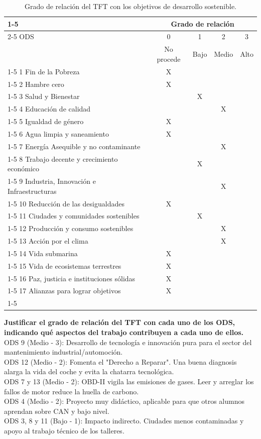 \begin{center}

\begin{table}[!htbp]
\caption{Grado de relación del TFT con los objetivos de desarrollo sostenible.}
\label{tab:ODS}
\centering
\begin{tabular}{|l|c|c|c|c|}
\cline{1-5}
  & \multicolumn{4}{c|}{Grado de relación} \\ \cline{2-5}
 ODS & 0 & 1 & 2 & 3 \\
  & No procede & Bajo & Medio & Alto \\
  \cline{1-5}
1 Fin de la Pobreza & X & & & \\ \cline{1-5}
2 Hambre cero & X & & & \\ \cline{1-5}
3 Salud y Bienestar & & X & & \\ \cline{1-5}
4 Educación de calidad & & & X & \\ \cline{1-5}
5 Igualdad de género & X & & & \\ \cline{1-5}
6 Agua limpia y saneamiento & X & & & \\ \cline{1-5}
7 Energía Asequible y no contaminante & & & X & \\ \cline{1-5}
8 Trabajo decente y crecimiento económico & & X & & \\ \cline{1-5}
9 Industria, Innovación e Infraestructuras & & & X & \\ \cline{1-5}
10 Reducción de las desigualdades & X & & & \\ \cline{1-5}
11 Ciudades y comunidades sostenibles & & X & & \\ \cline{1-5}
12 Producción y consumo sostenibles & & & X & \\ \cline{1-5}
13 Acción por el clima & & & X & \\ \cline{1-5}
14 Vida submarina & X & & & \\ \cline{1-5}
15 Vida de ecosistemas terrestres & X & & & \\ \cline{1-5}
16 Paz, justicia e instituciones sólidas & X & & & \\ \cline{1-5}
17 Alianzas para lograr objetivos & X & & & \\ \cline{1-5}
\end{tabular}%
\end{table}
\end{center}
\textbf{Justificar el grado de relación del TFT con cada uno de los ODS, indicando qué aspectos del trabajo contribuyen a cada uno de ellos.}
\\
ODS 9 (Medio - 3): Desarrollo de tecnología e innovación pura para el sector del mantenimiento industrial/automoción.\\
ODS 12 (Medio - 2): Fomenta el "Derecho a Reparar". Una buena diagnosis alarga la vida del coche y evita la chatarra tecnológica.\\
ODS 7 y 13 (Medio - 2): OBD-II vigila las emisiones de gases. Leer y arreglar los fallos de motor reduce la huella de carbono.\\
ODS 4 (Medio - 2): Proyecto muy didáctico, aplicable para que otros alumnos aprendan sobre CAN y bajo nivel.\\
ODS 3, 8 y 11 (Bajo - 1): Impacto indirecto. Ciudades menos contaminadas y apoyo al trabajo técnico de los talleres.
